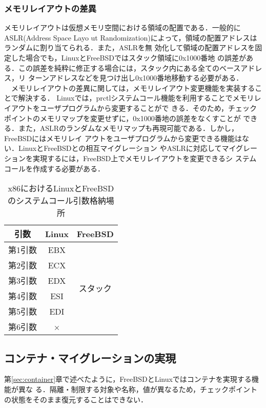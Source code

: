 \documentclass[10pt]{jarticle}
\begin{document}
  \subsubsection{メモリレイアウトの差異}
  メモリレイアウトは仮想メモリ空間における領域の配置である．一般的にASLR(Address Space
  Layo
  ut Randomization)によって，領域の配置アドレスはランダムに割り当てられる．また，ASLRを無
  効化して領域の配置アドレスを固定した場合でも，LinuxとFreeBSDではスタック領域に0x1000番地
  の誤差がある．この誤差を純粋に修正する場合には，スタック内にある全てのベースアドレス，リ
  ターンアドレスなどを見つけ出し0x1000番地移動する必要がある．\\
  　メモリレイアウトの差異に関しては，メモリレイアウト変更機能を実装することで解決する．
Linuxでは，prctlシステムコール機能を利用することでメモリレイアウトをユーザプログラムから変更することがで
きる．そのため，チェックポイントのメモリマップを変更せずに，0x1000番地の誤差をなくすことが
できる．また，ASLRのランダムなメモリマップも再現可能である．しかし，FreeBSDにはメモリレイ
アウトをユーザプログラムから変更できる機能はない．LinuxとFreeBSDとの相互マイグレーション
やASLRに対応してマイグレーションを実現するには，FreeBSD上でメモリレイアウトを変更できるシ
ステムコールを作成する必要がある．

\begin{table}[t]
  \caption{x86におけるLinuxとFreeBSDのシステムコール引数格納場所}
  \label{tb:argument}
  \begin{center}
  \begin{tabular}{|c|c|c|} \hline
    引数 & Linux & FreeBSD \\ \hline \hline
    第1引数 & EBX &\multirow{6}{*}{スタック}   \\ \cline{1-2}
    第2引数 & ECX &  \\ \cline{1-2}
    第3引数 & EDX &  \\ \cline{1-2}
    第4引数 & ESI & \\ \cline{1-2}
    第5引数 & EDI &  \\ \cline{1-2}
    第6引数 & × &  \\ \hline
  \end{tabular}
\end{center}
\end{table}

\subsection{コンテナ・マイグレーションの実現}
\label{sec:CM}
第\ref{sec:container}章で述べたように，FreeBSDとLinuxではコンテナを実現する機能が異な
る．隔離・制限する対象や名称，値が異なるため，チェックポイントの状態をそのまま復元することはできない．
\end{document}
